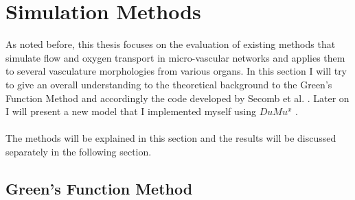 

\newpage
\section{Simulation Methods}
\label{Methods}

As noted before, this thesis focuses on the evaluation of existing
methods that simulate flow and oxygen transport in micro-vascular networks
and applies them to several vasculature morphologies from various organs. In this section I will try to give an overall understanding to the theoretical background to the Green's Function Method and accordingly the code developed by Secomb et al. \cite{Secomb2004}. Later on I will present a new model that I implemented myself using $DuMu^x$ \cite{flemisch2007dumux}.\\
\\The methods will be explained in this section and the results will be discussed separately in the following section.

\subsection{Green's Function Method}
\label{Greens}

